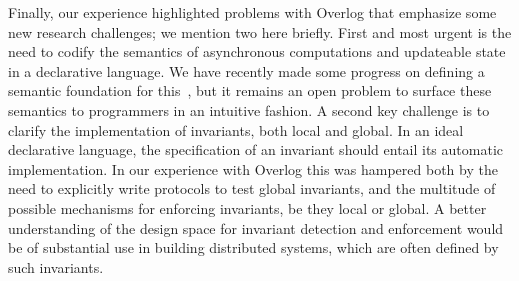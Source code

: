 Finally, our experience highlighted problems with Overlog that emphasize some
new research challenges; we mention two here briefly.  First and most urgent is
the need to codify the semantics of asynchronous computations and updateable
state in a declarative language.  We have recently made some progress on
defining a semantic foundation for this~\cite{dedalus-tr}, but it remains an
open problem to surface these semantics to programmers in an intuitive fashion.
A second key challenge is to clarify the implementation of invariants, both
local and global.  In an ideal declarative language, the specification of an
invariant should entail its automatic implementation.  In our experience with
Overlog this was hampered both by the need to explicitly write protocols to test
global invariants, and the multitude of possible mechanisms for enforcing
invariants, be they local or global.  A better understanding of the design space
for invariant detection and enforcement would be of substantial use in building
distributed systems, which are often defined by such invariants.


% 

